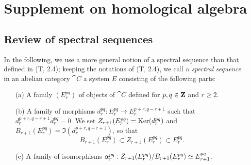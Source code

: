 \section{Supplement on homological algebra}
\label{section:0.11}

\subsection{Review of spectral sequences}
\label{subsection:0.11.1}

\begin{env}[11.1.1]
\label{0.11.1.1}
In the following, we use a more general notion of a spectral sequence than that defined in (T, 2.4); keeping the notations of (T, 2.4), we call a \emph{spectral sequence} in an abelian category $\cat{C}$ a system $E$ consisting of the following parts:
\begin{enumerate}
  \item[(a)] A family $(E_r^{pq})$ of objects of $\cat{C}$ defined for $p,q\in\mathbf{Z}$ and $r\geq 2$.
  \item[(b)] A family of morphisms $d_r^{pq}:E_r^{pq}\to E_r^{p+r,q-r+1}$ such that $d_r^{p+r,q-r+1}d_r^{pq}=0$.
    We set $Z_{r+1}(E_r^{pq})=\operatorname{Ker}(d_r^{pq})$ and $B_{r+1}(E_r^{pq})=\Im(d_r^{p+r,q-r+1})$, so that
    \[
      B_{r+1}(E_r^{pq})\subset Z_{r+1}(E_r^{pq})\subset E_r^{pq}.
    \]
  \item[(c)] A family of isomorphisms $\alpha_r^{pq}:Z_{r+1}(E_r^{pq})/B_{r+1}(E_r^{pq})\simeq E_{r+1}^{pq}$.


\end{enumerate}
\end{env}
